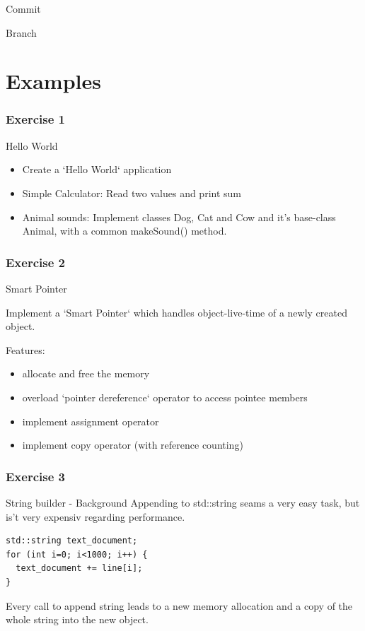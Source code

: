 \documentclass{beamer}
\begin{document}
\begin{frame}{Commit}
\end{frame}

\begin{frame}{Branch}
\end{frame}

\part{Examples}

\section{Exercise 1}
\begin{frame}{Hello World}
\begin{itemize}
  \item Create a `Hello World` application
  \item Simple Calculator: Read two values and print sum
  \item Animal sounds: Implement classes Dog, Cat and Cow and it's base-class
  Animal, with a common makeSound() method.
\end{itemize}
\end{frame}

\section{Exercise 2}

\begin{frame}{Smart Pointer}
\subtitle{}
Implement a `Smart Pointer` which handles object-live-time of a newly created
object.
\par
Features:
\begin{itemize}
  \item allocate and free the memory
  \item overload `pointer dereference` operator to access pointee members
  \item implement assignment operator
  \item implement copy operator (with reference counting)
\end{itemize}

\end{frame}

\section{Exercise 3}

\begin{frame}[fragile]{String builder - Background}
Appending to std::string seams a very easy task, but is't very expensiv
regarding performance.

\begin{lstlisting}
std::string text_document;
for (int i=0; i<1000; i++) {
  text_document += line[i];
}
\end{lstlisting}

Every call to append string leads to a new memory allocation and a copy
of the whole string into the new object.
\end{frame}
\end{document}

